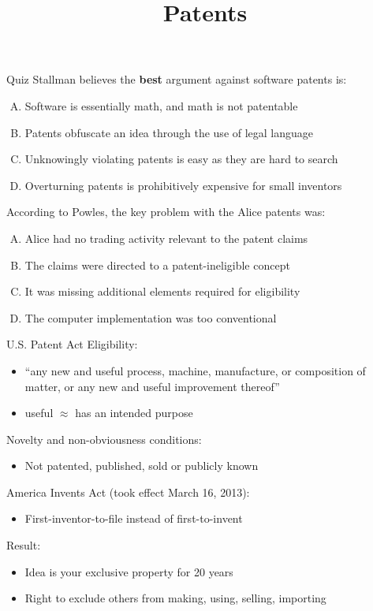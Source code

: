 \documentclass{beamer}
\title{Patents}
\date{}
\begin{document}
\begin{frame}
\titlepage
\end{frame}

\begin{frame}{Quiz}
Stallman believes the \textbf{best} argument against software patents is:
\begin{enumerate}[(A)]
\item<1-2> Software is essentially math, and math is not patentable
\item<1> Patents obfuscate an idea through the use of legal language
\item<1> Unknowingly violating patents is easy as they are hard to search
\item<1> Overturning patents is prohibitively expensive for small inventors
\end{enumerate}
\bigskip
According to Powles, the key problem with the Alice patents was:
\begin{enumerate}[(A)]
\item<1> Alice had no trading activity relevant to the patent claims
\item<1> The claims were directed to a patent-ineligible concept
\item<1-2> It was missing additional elements required for eligibility
\item<1> The computer implementation was too conventional
\end{enumerate}
\end{frame}

\begin{frame}{U.S. Patent Act}
Eligibility:
\begin{itemize}
\item ``any new and useful process, machine, manufacture, or composition of matter, or any new and useful improvement thereof''
\item useful $\approx$ has an intended purpose
\end{itemize}
Novelty and non-obviousness conditions:
\begin{itemize}
\item Not patented, published, sold or publicly known
\end{itemize}
America Invents Act (took effect March 16, 2013):
\begin{itemize}
\item First-inventor-to-file instead of first-to-invent
\end{itemize}
\bigskip
Result:
\begin{itemize}
\item Idea is your exclusive property for 20 years
\item Right to exclude others from making, using, selling, importing
\end{itemize}
\end{frame}
\end{document}
